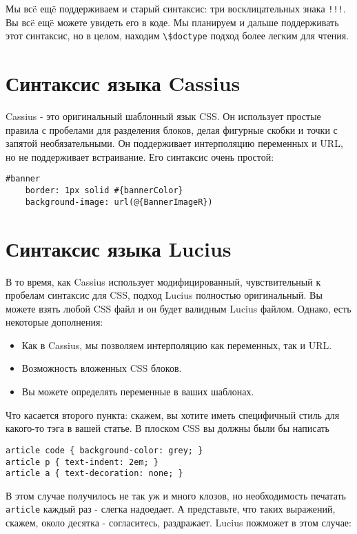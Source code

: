 Мы всë ещë поддерживаем и старый синтаксис: три восклицательных знака \texttt{!!!}.
Вы всë ещë можете увидеть его в коде. Мы планируем и дальше поддерживать этот
синтаксис, но в целом, находим \lstinline!\$doctype! подход более легким для чтения.

\section{Синтаксис языка Cassius}
Cassius - это оригинальный шаблонный язык CSS. Он использует простые правила
с пробелами для разделения блоков, делая фигурные скобки и точки с запятой 
необязательными. Он поддерживает интерполяцию переменных и URL, но не поддерживает
встраивание. Его синтаксис очень простой:

\begin{lstlisting}
#banner
    border: 1px solid #{bannerColor}
    background-image: url(@{BannerImageR})
\end{lstlisting}

\section{Синтаксис языка Lucius}
В то время, как Cassius использует модифицированный, чувствительный к пробелам 
синтаксис для CSS, подход Lucius полностью оригинальный. Вы можете взять любой CSS
файл и он будет валидным Lucius файлом. Однако, есть некоторые дополнения:

\begin{itemize}
\item Как в Cassius, мы позволяем интерполяцию как переменных, так и URL.
\item Возможность вложенных CSS блоков.
\item Вы можете определять переменные в ваших шаблонах.
\end{itemize}

Что касается второго пункта: скажем, вы хотите иметь специфичный стиль для 
какого-то тэга в вашей статье. В плоском CSS вы должны были бы написать

\begin{lstlisting}
article code { background-color: grey; }
article p { text-indent: 2em; }
article a { text-decoration: none; }
\end{lstlisting}

В этом случае получилось не так уж и много клозов, но необходимость печатать
\texttt{article} каждый раз - слегка надоедает. А представьте, что таких выражений, 
скажем, около десятка - согласитесь, раздражает.
Lucius пожможет в этом случае:

